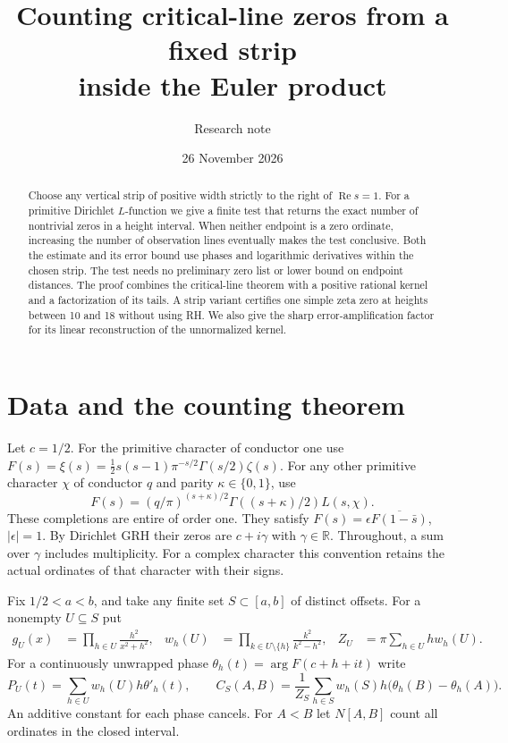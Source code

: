 \documentclass[11pt]{article}
\title{Counting critical-line zeros from a fixed strip\\inside the Euler product}
\author{Research note}
\date{26 November 2026}
\newcommand{\R}{\mathbb R}
\newcommand{\Real}{\operatorname{Re}}
\begin{document}
\maketitle
\begin{abstract}
Choose any vertical strip of positive width strictly to the right of $\Real s=1$.
For a primitive Dirichlet $L$-function we give a finite test that returns the
exact number of nontrivial zeros in a height interval. When neither endpoint
is a zero ordinate, increasing the number of observation lines eventually
makes the test conclusive. Both the estimate and its error bound use phases
and logarithmic derivatives within the chosen strip. The test needs no
preliminary zero list or lower bound on endpoint distances. The proof combines
the critical-line theorem with a positive rational kernel and a factorization
of its tails. A strip variant certifies one simple zeta zero at heights
between 10 and 18 without using RH. We also give the sharp error-amplification factor for its linear
reconstruction of the unnormalized kernel.
\end{abstract}

\section{Data and the counting theorem}
Let $c=1/2$. For the primitive character of conductor one use
$F(s)=\xi(s)=\tfrac12s(s-1)\pi^{-s/2}\Gamma(s/2)\zeta(s)$. For any other
primitive character $\chi$ of conductor $q$ and parity
$\kappa\in\{0,1\}$, use
\[
 F(s)=(q/\pi)^{(s+\kappa)/2}\Gamma((s+\kappa)/2)L(s,\chi).
\]
These completions are entire of order one. They satisfy
$F(s)=\epsilon\overline{F(1-\bar s)}$, $|\epsilon|=1$. By Dirichlet GRH their
zeros are $c+i\gamma$ with $\gamma\in\R$. Throughout, a sum over $\gamma$
includes multiplicity. For a complex character this convention retains the
actual ordinates of that character with their signs.

Fix $1/2<a<b$, and take any finite set $S\subset[a,b]$ of distinct offsets.
For a nonempty $U\subseteq S$ put
\begin{align}
 g_U(x)&=\prod_{h\in U}\frac{h^2}{x^2+h^2},&
 w_h(U)&=\prod_{k\in U\setminus\{h\}}\frac{k^2}{k^2-h^2},&
 Z_U&=\pi\sum_{h\in U}h w_h(U). \label{eq:weights}
\end{align}
For a continuously unwrapped phase $\theta_h(t)=\arg F(c+h+it)$ write
\[
 P_U(t)=\sum_{h\in U} w_h(U) h\theta'_h(t),\qquad
 C_S(A,B)=\frac1{Z_S}\sum_{h\in S} w_h(S)h
                  \big(\theta_h(B)-\theta_h(A)\big).
\]
An additive constant for each phase cancels. For $A<B$ let $N[A,B]$ count
all ordinates in the closed interval.
\end{document}
